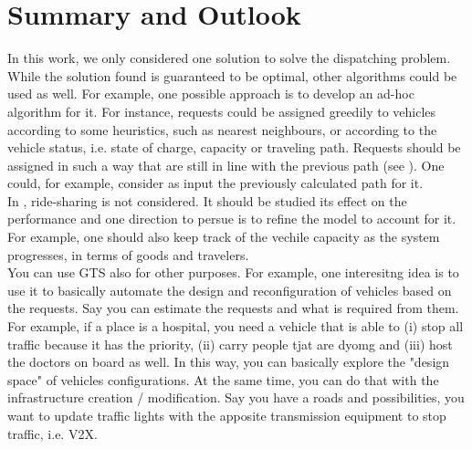 \chapter{Summary and Outlook}

In this work, we only considered one solution to solve the dispatching problem. While the solution found is guaranteed to be optimal, other algorithms could be used as well. For example, one possible approach is to develop an ad-hoc algorithm for it. For instance, requests could be assigned greedily to vehicles according to some heuristics, such as nearest neighbours, or according to the vehicle status, i.e. state of charge, capacity or traveling path. Requests should be assigned in such a way that are still in line with the previous path (see ). One could, for example, consider as input the previously calculated path for it. \\

In , ride-sharing is not considered. It should be studied its effect on the performance and one direction to persue is to refine the model to account for it. For example, one should also keep track of the vechile capacity as the system progresses, in terms of goods and travelers. \\

You can use GTS also for other purposes. For example, one interesitng idea is to use it to basically automate the design and reconfiguration of vehicles based on the requests. Say you can estimate the requests and what is required from them. For example, if a place is a hospital, you need a vehicle that is able to (i) stop all traffic because it has the priority, (ii) carry people tjat are dyomg and (iii) host the doctors on board as well. In this way, you can basically explore the "design space" of vehicles configurations. At the same time, you can do that with the infrastructure creation / modification. Say you have a roads and possibilities, you want to update traffic lights with the apposite transmission equipment to stop traffic, i.e. V2X. 